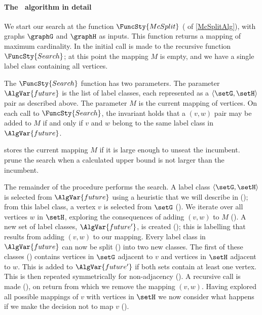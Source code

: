 \paragraph{The \McSplit\ algorithm in detail} We start our search at the function
$\FuncSty{McSplit}$ ( of \cref{McSplitAlg}),
with graphs $\graphG$ and $\graphH$ as inputs.  This function returns a mapping of
maximum cardinality.  In  the initial call is made to
the recursive function $\FuncSty{Search}$; at this point
the mapping $M$ is empty, and
we have a single label class containing all vertices.

The
$\FuncSty{Search}$ function has two parameters.  The parameter $\AlgVar{future}$ is the
list of label classes, each represented as a $\langle \setG, \setH \rangle$ pair as
described above.  The parameter $M$ is the current mapping of vertices.  On
each call to $\FuncSty{Search}$, the invariant holds that a $(v,w)$ pair may be
added to $M$ if and only if $v$ and $w$ belong to the same label class in
$\AlgVar{future}$.

 stores the current mapping $M$ if it is large enough
to unseat the incumbent.   prune the
search when a calculated upper bound is not larger than the incumbent.

The remainder of the procedure performs the search.  A label class
$\langle \setG, \setH \rangle$ is selected from $\AlgVar{future}$
using a heuristic that we will describe in 
(); from this label class, a vertex $v$ is selected
from $\setG$ (). We iterate over all
vertices $w$ in $\setH$, exploring the consequences of adding $(v,w)$ to $M$
().  A new set of label classes,
$\AlgVar{future'}$,
is created (); this is labelling that results
from adding $(v,w)$ to our mapping.  Every label class in $\AlgVar{future}$ can
now be split () into two new classes. The
first of these classes ()
contains vertices in $\setG$ adjacent to $v$ and vertices in $\setH$ adjacent to $w$.
This is added to $\AlgVar{future'}$ if both sets contain at least one vertex.
This is then repeated symmetrically for non-adjacency
(). A recursive call is made
(), on return from which we remove the mapping $(v,w)$.
Having explored all possible mappings of $v$ with vertices in $\setH$ we now
consider what happens if we make the decision not to map $v$
().

